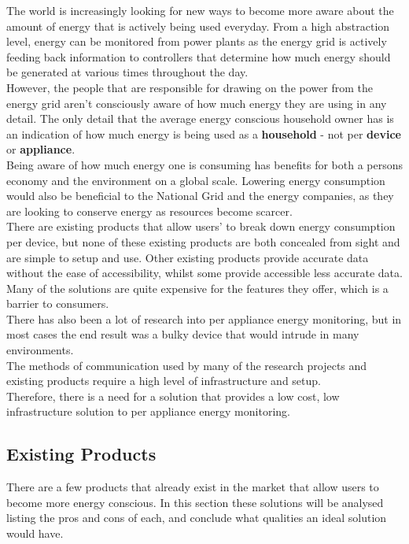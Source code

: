\documentclass[draft,preprint,12pt,3p]{elsarticle}
\begin{document}
The world is increasingly looking for new ways to become more aware about the amount of energy that is actively being used everyday. From a high abstraction level, energy can be monitored from power plants as the energy grid is actively feeding back information to controllers that determine how much energy should be generated at various times throughout the day.\\
However, the people that are responsible for drawing on the power from the energy grid aren't consciously aware of how much energy they are using in any detail. The only detail that the average energy conscious household owner has is an indication of how much energy is being used as a \textbf{household} - not per \textbf{device} or \textbf{appliance}.\\
Being aware of how much energy one is consuming has benefits for both a persons economy and the environment on a global scale. Lowering energy consumption would also be beneficial to the National Grid and the energy companies, as they are looking to conserve energy as resources become scarcer.\\
There are existing products that allow users' to break down energy consumption per device, but none of these existing products are both concealed from sight and are simple to setup and use. Other existing products provide accurate data without the ease of accessibility, whilst some provide accessible less accurate data. Many of the solutions are quite expensive for the features they offer, which is a barrier to consumers.\\
There has also been a lot of research into per appliance energy monitoring, but in most cases the end result was a bulky device that would intrude in many environments.\\
The methods of communication used by many of the research projects and existing products require a high level of infrastructure and setup.\\ 
Therefore, there is a need for a solution that provides a low cost, low infrastructure solution to per appliance energy monitoring.


\subsection{Existing Products}

There are a few products that already exist in the market that allow users to become more energy conscious. In this section these solutions will be analysed listing the pros and cons of each, and conclude what qualities an ideal solution would have.
\end{document}
